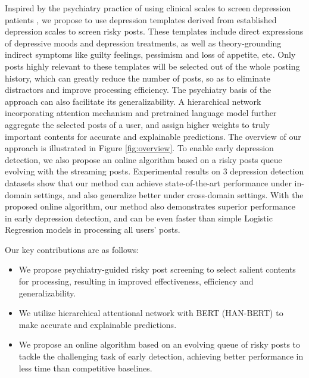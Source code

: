 Inspired by the psychiatry practice of using clinical scales to screen depression patients \citep{beck1996beck}, we propose to use depression templates derived from established depression scales to screen risky posts. These templates include direct expressions of depressive moods and depression treatments, as well as theory-grounding indirect symptoms like guilty feelings, pessimism and loss of appetite, etc. Only posts highly relevant to these templates will be selected out of the whole posting history, which can greatly reduce the number of posts, so as to eliminate distractors and improve processing efficiency. The psychiatry basis of the approach can also facilitate its generalizability. A hierarchical network incorporating attention mechanism \citep{yang2016hierarchical} and pretrained language model \citep{devlin2018bert} further aggregate the selected posts of a user, and assign higher weights to truly important contents for accurate and explainable predictions. The overview of our approach is illustrated in Figure \ref{fig:overview}. To enable early depression detection, we also propose an online algorithm based on a risky posts queue evolving with the streaming posts. Experimental results on 3 depression detection datasets show that our method can achieve state-of-the-art performance under in-domain settings, and also generalize better under cross-domain settings. With the proposed online algorithm, our method also demonstrates superior performance in early depression detection, and can be even faster than simple Logistic Regression models in processing all users' posts.

Our key contributions are as follows:
\begin{itemize}
    \item We propose psychiatry-guided risky post screening to select salient contents for processing, resulting in improved effectiveness, efficiency and generalizability.
    \item We utilize hierarchical attentional network with BERT (HAN-BERT) to make accurate and explainable predictions.
    \item We propose an online algorithm based on an evolving queue of risky posts to tackle the challenging task of early detection, achieving better performance in less time than competitive baselines. 
\end{itemize}

